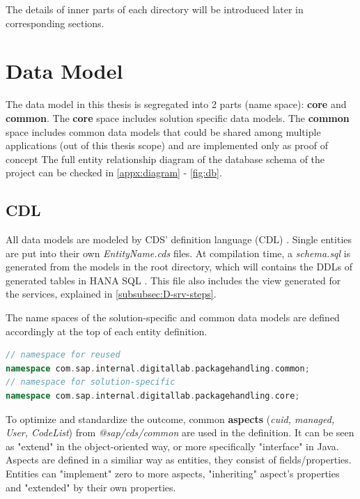 The details of inner parts of each directory will be introduced later in corresponding sections.

\section{Data Model}
\label{sec:D-db}

The data model in this thesis is segregated into 2 parts (name space): \textbf{core} and \textbf{common}. 
The \textbf{core} space includes solution specific data models. The \textbf{common} space includes common data models that could be shared among multiple applications (out of this thesis scope) and are implemented only as proof of concept The full entity relationship diagram of the database schema of the project can be checked in \autoref{appx:diagram} - \autoref{fig:db}. 


\subsection{CDL}
\label{subsec:db-cdl}
All data models are modeled by CDS' definition language (CDL) \cite{cap-cds-cdl}. Single entities are put into their own \textit{EntityName.cds} files. 
At compilation time, a \textit{schema.sql} is generated from the models in the root directory, which will contains the DDLs of generated tables in HANA SQL \cite{hanasql}. This file also includes the view generated for the services, explained in \autoref{subsubsec:D-srv-steps}.


The name spaces of the solution-specific and common data models are defined accordingly at the top of each entity definition.

\begin{lstlisting}[language={c++}]
// namespace for reused
namespace com.sap.internal.digitallab.packagehandling.common; 
// namespace for solution-specific
namespace com.sap.internal.digitallab.packagehandling.core; 
\end{lstlisting}


To optimize and standardize the outcome, common \textbf{aspects} (\textit{cuid, managed, User, CodeList}) from \textit{@sap/cds/common} are used in the definition. \cite{cap-cds-common-aspects} It can be seen as "extend" in the object-oriented way, or more specifically "interface" in Java. Aspects are defined in a similiar way as entities, they consist of fields/properties. Entities can "implement" zero to more aspects, "inheriting" aspect's properties and "extended" by their own properties. 

